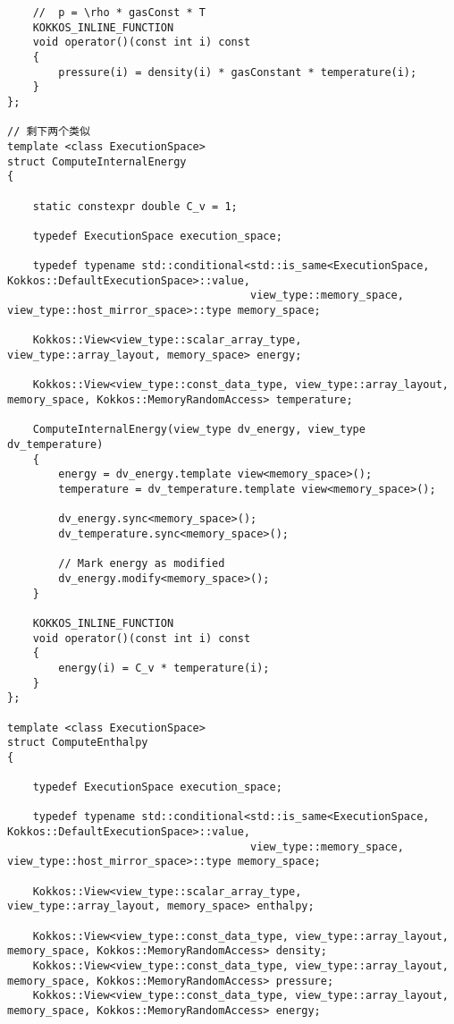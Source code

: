 \begin{lstlisting}
    //  p = \rho * gasConst * T
    KOKKOS_INLINE_FUNCTION
    void operator()(const int i) const
    {
        pressure(i) = density(i) * gasConstant * temperature(i);
    }
};

// 剩下两个类似
template <class ExecutionSpace>
struct ComputeInternalEnergy
{

    static constexpr double C_v = 1;

    typedef ExecutionSpace execution_space;

    typedef typename std::conditional<std::is_same<ExecutionSpace, Kokkos::DefaultExecutionSpace>::value,
                                      view_type::memory_space, view_type::host_mirror_space>::type memory_space;

    Kokkos::View<view_type::scalar_array_type, view_type::array_layout, memory_space> energy;

    Kokkos::View<view_type::const_data_type, view_type::array_layout, memory_space, Kokkos::MemoryRandomAccess> temperature;

    ComputeInternalEnergy(view_type dv_energy, view_type dv_temperature)
    {
        energy = dv_energy.template view<memory_space>();
        temperature = dv_temperature.template view<memory_space>();

        dv_energy.sync<memory_space>();
        dv_temperature.sync<memory_space>();

        // Mark energy as modified
        dv_energy.modify<memory_space>();
    }

    KOKKOS_INLINE_FUNCTION
    void operator()(const int i) const
    {
        energy(i) = C_v * temperature(i);
    }
};

template <class ExecutionSpace>
struct ComputeEnthalpy
{

    typedef ExecutionSpace execution_space;

    typedef typename std::conditional<std::is_same<ExecutionSpace, Kokkos::DefaultExecutionSpace>::value,
                                      view_type::memory_space, view_type::host_mirror_space>::type memory_space;

    Kokkos::View<view_type::scalar_array_type, view_type::array_layout, memory_space> enthalpy;

    Kokkos::View<view_type::const_data_type, view_type::array_layout, memory_space, Kokkos::MemoryRandomAccess> density;
    Kokkos::View<view_type::const_data_type, view_type::array_layout, memory_space, Kokkos::MemoryRandomAccess> pressure;
    Kokkos::View<view_type::const_data_type, view_type::array_layout, memory_space, Kokkos::MemoryRandomAccess> energy;


\end{lstlisting}
